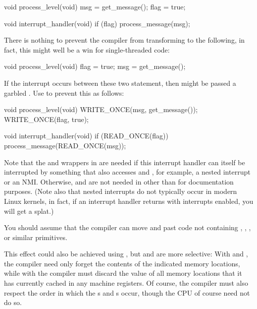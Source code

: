 \begin{itemize}
\begin{VerbatimU}
	void process_level(void)
	{
		msg = get_message();
		flag = true;
	}

	void interrupt_handler(void)
	{
		if (flag)
			process_message(msg);
	}
\end{VerbatimU}

     There is nothing to prevent the compiler from transforming
      to the following, in fact, this might well be a
     win for single-threaded code:

\begin{VerbatimU}
	void process_level(void)
	{
		flag = true;
		msg = get_message();
	}
\end{VerbatimU}

     If the interrupt occurs between these two statement, then
      might be passed a garbled .
     Use  to prevent this as follows:

\begin{VerbatimU}
	void process_level(void)
	{
		WRITE_ONCE(msg, get_message());
		WRITE_ONCE(flag, true);
	}

	void interrupt_handler(void)
	{
		if (READ_ONCE(flag))
			process_message(READ_ONCE(msg));
	}
\end{VerbatimU}

     Note that the  and  wrappers in
      are needed if this interrupt handler can itself
     be interrupted by something that also accesses  and ,
     for example, a nested interrupt or an NMI\@.
     Otherwise,  and  are not needed
     in  other than for documentation purposes.
     (Note also that nested interrupts do not typically occur in modern
     Linux kernels, in fact, if an interrupt handler returns with
     interrupts enabled, you will get a  splat.)

     You should assume that the compiler can move  and
      past code not containing ,
     , , or similar primitives.

     This effect could also be achieved using , but
      and  are more selective:
     With  and , the compiler need only
     forget the contents of the indicated memory locations, while with
      the compiler must discard the value of all memory
     locations that it has currently cached in any machine registers.
     Of course, the compiler must also respect the order in which the
     s and s occur, though the CPU of
     course need not do so.


\end{itemize}
